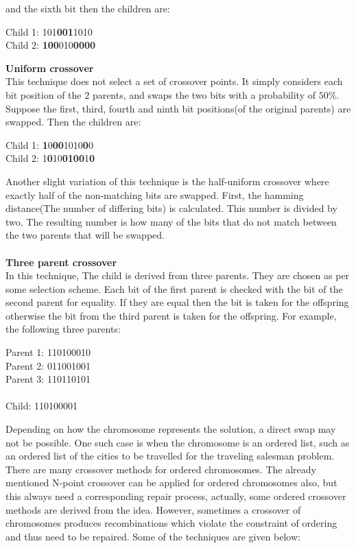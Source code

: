 \documentclass[a4paper, 12pt]{article}
\begin{document}
and the sixth bit then the children are:
\begin{center}
Child 1: 101\textbf{001}1010\\
Child 2: \textbf{100}010\textbf{0000}
\end{center}
\textbf{Uniform crossover}\\
This technique does not select a set of crossover points. It simply considers each bit position of the $2$ parents, and swaps the two bits with
a probability of $50\%$. Suppose the first, third, fourth and ninth bit positions(of the original parents) are swapped. Then the children are:
\begin{center}
Child 1: \textbf{1}0\textbf{00}1010\textbf{0}0\\
Child 2: 1\textbf{0}10\textbf{0100}1\textbf{0}
\end{center}
Another slight variation of this technique is the half-uniform crossover where exactly half of the non-matching bits are swapped. First, the 
hamming distance(The number of differing bits) is calculated. This number is divided by two. The resulting number is how many of the bits
that do not match between the two parents that will be swapped.\\~\\
\textbf{Three parent crossover}\\
In this technique, The child is derived from three parents. They are chosen as per some selection scheme. Each bit of the first parent is
checked with the bit of the second parent for equality. If they are equal then the bit is taken for the offspring otherwise the bit from the
third parent is taken for the offspring. For example, the following three parents:
\begin{center}
Parent 1: 110100010\\
Parent 2: 011001001\\
Parent 3: 110110101\\~\\
Child: 110100001
\end{center}
Depending on how the chromosome represents the solution, a direct swap may not be possible. One such case is when the chromosome is an ordered list, such as an ordered list of the cities to be travelled for the traveling salesman problem. There are many crossover methods for ordered chromosomes. The already mentioned N-point crossover can be applied for ordered chromosomes also, but this always need a corresponding repair process, actually, some ordered crossover methods are derived from the idea. However, sometimes a crossover of chromosomes produces recombinations which violate the constraint of ordering and thus need to be repaired. Some of the techniques are given below:
\end{document}
